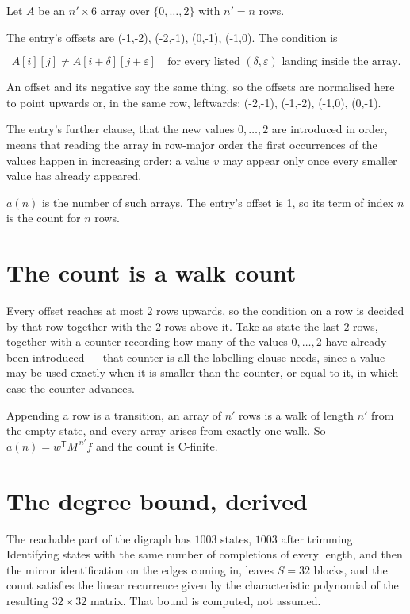 \documentclass[11pt]{article}
\theoremstyle{definition}
\begin{document}
Let $A$ be an $n' \times 6$ array over $\{0,\dots,2\}$ with $n' = n$ rows.

The entry's offsets are (-1,-2), (-2,-1), (0,-1), (-1,0). The condition is

\[A[i][j] \ne A[i{+}\delta][j{+}\varepsilon]\quad\text{for every listed }(\delta,\varepsilon)\text{ landing inside the array.}\]

An offset and its negative say the same thing, so the offsets are normalised here to point upwards or, in the same row, leftwards: (-2,-1), (-1,-2), (-1,0), (0,-1).

The entry's further clause, that the new values $0,\dots,2$ are introduced in order, means that reading the array in row-major order the first occurrences of the values happen in increasing order: a value $v$ may appear only once every smaller value has already appeared.

$a(n)$ is the number of such arrays. The entry's offset is 1, so its term of index $n$ is the count for $n$ rows.

\section{The count is a walk count}

Every offset reaches at most $2$ rows upwards, so the condition on a row is decided by that row together with the $2$ rows above it. Take as state the last $2$ rows, together with a counter recording how many of the values $0,\dots,2$ have already been introduced --- that counter is all the labelling clause needs, since a value may be used exactly when it is smaller than the counter, or equal to it, in which case the counter advances.

Appending a row is a transition, an array of $n'$ rows is a walk of length $n'$ from the empty state, and every array arises from exactly one walk. So $a(n) = w^{\mathsf T}M^{\,n'}f$ and the count is C-finite.

\section{The degree bound, derived}

The reachable part of the digraph has $1003$ states, $1003$ after trimming. Identifying states with the same number of completions of every length, and then the mirror identification on the edges coming in, leaves $S = 32$ blocks, and the count satisfies the linear recurrence given by the characteristic polynomial of the resulting $32\times32$ matrix. That bound is computed, not assumed.
\end{document}
